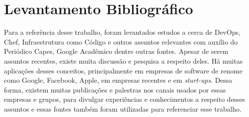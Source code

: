 \section{Levantamento Bibliográfico}

Para a referência desse trabalho, foram levantados estudos a cerca de
\mbox{DevOps}, Chef, Infraestrutura como Código e outros assuntos relevantes com
auxílio do Periódico Capes, Google Acadêmico dentre outras fontes.
Apesar de serem assuntos recentes, existe muita discussão e pesquisa a
respeito deles. Há muitas aplicações desses conceitos, principalmente
em empresas de software de renome como Google, Facebook, Apple, em
empresas recentes e em \textit{start-ups}. Dessa forma, existem muitas publicações e %
palestras nos canais usados por essas empresas e grupos, para divulgar
experiências e conhecimentos a respeito desses assuntos e essas fontes
também foram utilizadas para referenciar esse trabalho.



